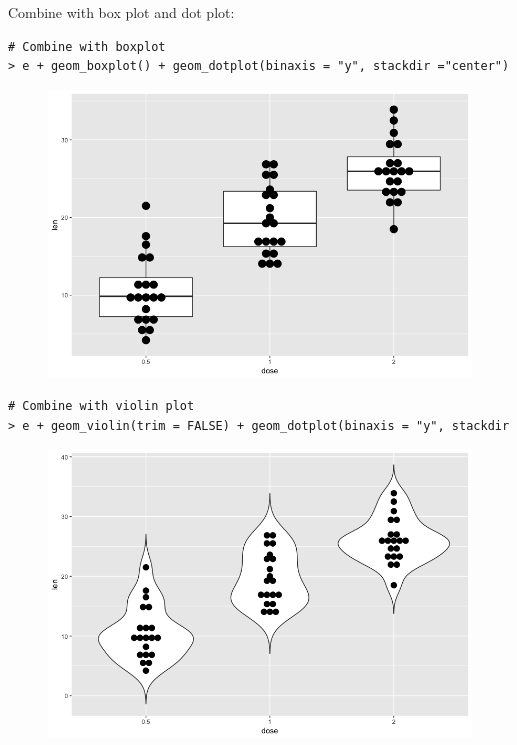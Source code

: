 Combine with box plot and dot plot:
\begin{lstlisting}[language=html]
# Combine with boxplot
> e + geom_boxplot() + geom_dotplot(binaxis = "y", stackdir ="center")
\end{lstlisting}
\begin{figure}[H]\begin{center}\includegraphics[scale=1 ]{ilu/bg105.png}\end{center}\end{figure}
\begin{lstlisting}[language=html]
# Combine with violin plot
> e + geom_violin(trim = FALSE) + geom_dotplot(binaxis = "y", stackdir ="center")
\end{lstlisting}
\begin{figure}[H]\begin{center}\includegraphics[scale=1 ]{ilu/bg106.png}\end{center}\end{figure}
